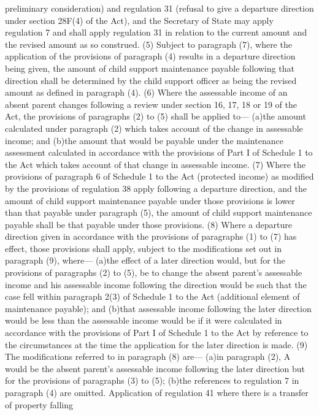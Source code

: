 \documentclass[a4paper]{article}
\begin{document}
preliminary consideration) and regulation 31 (refusal to give a departure
direction under section 28F(4) of the Act), and the Secretary of State may apply
regulation 7 and shall apply regulation 31 in relation to the current amount and
the revised amount as so construed.
(5) Subject to paragraph (7), where the application of the provisions of
paragraph (4) results in a departure direction being given, the amount of child
support maintenance payable following that direction shall be determined by the
child support officer as being the revised amount as defined in paragraph (4).
(6) Where the assessable income of an absent parent changes following a review
under section 16, 17, 18 or 19 of the Act, the provisions of paragraphs (2) to
(5) shall be applied to—
(a)the amount calculated under paragraph (2) which takes account of the change
in assessable income; and
(b)the amount that would be payable under the maintenance assessment calculated
in accordance with the provisions of Part I of Schedule 1 to the Act which takes
account of that change in assessable income.
(7) Where the provisions of paragraph 6 of Schedule 1 to the Act (protected
income) as modified by the provisions of regulation 38 apply following a
departure direction, and the amount of child support maintenance payable under
those provisions is lower than that payable under paragraph (5), the amount of
child support maintenance payable shall be that payable under those provisions.
(8) Where a departure direction given in accordance with the provisions of
paragraphs (1) to (7) has effect, those provisions shall apply, subject to the
modifications set out in paragraph (9), where—
(a)the effect of a later direction would, but for the provisions of paragraphs
(2) to (5), be to change the absent parent’s assessable income and his
assessable income following the direction would be such that the case fell
within paragraph 2(3) of Schedule 1 to the Act (additional element of
maintenance payable); and
(b)that assessable income following the later direction would be less than the
assessable income would be if it were calculated in accordance with the
provisions of Part I of Schedule 1 to the Act by reference to the circumstances
at the time the application for the later direction is made.
(9) The modifications referred to in paragraph (8) are—
(a)in paragraph (2), A would be the absent parent’s assessable income following
the later direction but for the provisions of paragraphs (3) to (5);
(b)the references to regulation 7 in paragraph (4) are omitted.
Application of regulation 41 where there is a transfer of property falling
\end{document}

